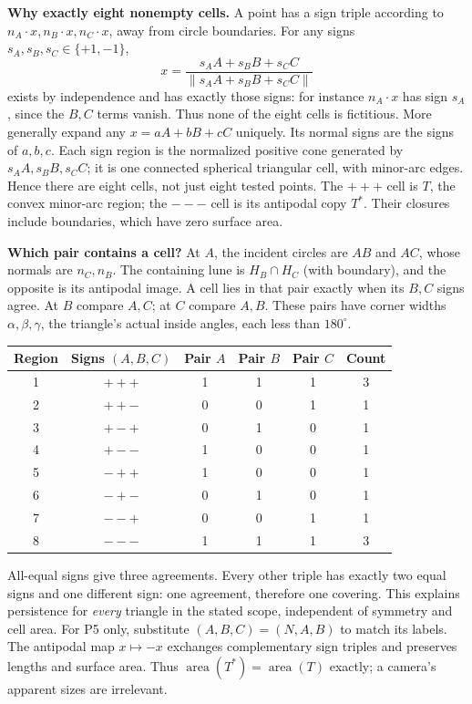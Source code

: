 \documentclass[11pt,letterpaper]{article}
\newcommand{\degc}{^\circ}
\begin{document}
\textbf{Why exactly eight nonempty cells.} A point has a sign triple according to $n_A\cdot x,n_B\cdot x,n_C\cdot x$, away from circle boundaries. For any signs $s_A,s_B,s_C\in\{+1,-1\}$,
\[
 x=\frac{s_AA+s_BB+s_CC}{\lVert s_AA+s_BB+s_CC\rVert}
\]
exists by independence and has exactly those signs: for instance $n_A\cdot x$ has sign $s_A$, since the $B,C$ terms vanish. Thus none of the eight cells is fictitious. More generally expand any $x=aA+bB+cC$ uniquely. Its normal signs are the signs of $a,b,c$. Each sign region is the normalized positive cone generated by $s_AA,s_BB,s_CC$; it is one connected spherical triangular cell, with minor-arc edges. Hence there are eight cells, not just eight tested points. The $+++$ cell is $T$, the convex minor-arc region; the $---$ cell is its antipodal copy $T^*$. Their closures include boundaries, which have zero surface area.

\textbf{Which pair contains a cell?} At $A$, the incident circles are $AB$ and $AC$, whose normals are $n_C,n_B$. The containing lune is $H_B\cap H_C$ (with boundary), and the opposite is its antipodal image. A cell lies in that pair exactly when its $B,C$ signs agree. At $B$ compare $A,C$; at $C$ compare $A,B$. These pairs have corner widths $\alpha,\beta,\gamma$, the triangle's actual inside angles, each less than $180\degc$.

\begin{center}\begin{tabular}{c|c|ccc|c}
Region & Signs $(A,B,C)$ & Pair $A$ & Pair $B$ & Pair $C$ & Count\\\hline
1 & $+++ $ &1&1&1&3\\
2 & $++- $ &0&0&1&1\\
3 & $+-+ $ &0&1&0&1\\
4 & $+-- $ &1&0&0&1\\
5 & $-++ $ &1&0&0&1\\
6 & $-+- $ &0&1&0&1\\
7 & $--+ $ &0&0&1&1\\
8 & $--- $ &1&1&1&3
\end{tabular}\end{center}
All-equal signs give three agreements. Every other triple has exactly two equal signs and one different sign: one agreement, therefore one covering. This explains persistence for \emph{every} triangle in the stated scope, independent of symmetry and cell area. For P5 only, substitute $(A,B,C)=(N,A,B)$ to match its labels. The antipodal map $x\mapsto-x$ exchanges complementary sign triples and preserves lengths and surface area. Thus $\operatorname{area}(T^*)=\operatorname{area}(T)$ exactly; a camera's apparent sizes are irrelevant.
\end{document}
